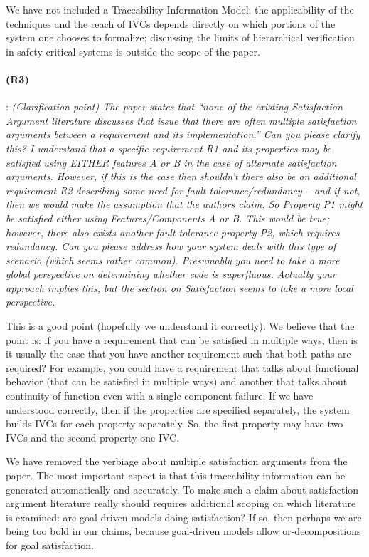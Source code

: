 \documentclass{article}
\begin{document}
We have not included a Traceability Information Model; the applicability of the techniques and the reach of IVCs depends directly on which portions of the system one chooses to formalize; discussing the limits of hierarchical verification in safety-critical systems is outside the scope of the paper.

\paragraph{(R3)}:
\textit{(Clarification point) The paper states that ``none of the existing Satisfaction Argument literature discusses that issue that there are often multiple satisfaction arguments between a requirement and its implementation.'' Can you please clarify this? I understand that a specific requirement R1 and its properties may be satisfied using EITHER features A or B in the case of alternate satisfaction arguments. However, if this is the case then shouldn't there also be an additional requirement R2 describing some need for fault tolerance/redundancy -- and if not, then we would make the assumption that the authors claim. So Property P1 might be satisfied either using Features/Components A or B. This would be true; however, there also exists another fault tolerance property P2, which requires redundancy. Can you please address how your system deals with this type of scenario (which seems rather common). Presumably you need to take a more global perspective on determining whether code is superfluous. Actually your approach implies this; but the section on Satisfaction seems to take a more local perspective.}
\vspace{0.05in}

This is a good point (hopefully we understand it correctly).  We believe that the point is: if you have a requirement that can be satisfied in multiple ways, then is it usually the case that you have another requirement such that both paths are required?  For example, you could have a requirement that talks about functional behavior (that can be satisfied in multiple ways) and another that talks about continuity of function even with a single component failure.  If we have understood correctly, then if the properties are specified separately, the system builds IVCs for each property separately.  So, the first property may have two IVCs and the second property one IVC.

We have removed the verbiage about multiple satisfaction arguments from the paper.  The most important aspect is that this traceability information can be generated automatically and accurately.  To make such a claim about satisfaction argument literature really should requires additional scoping on which literature is examined: are goal-driven models doing satisfaction?  If so, then perhaps we are being too bold in our claims, because goal-driven models allow or-decompositions for goal satisfaction.
\end{document}
